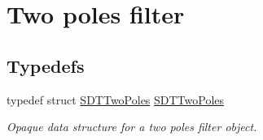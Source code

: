 \hypertarget{group__twopoles}{}\section{Two poles filter}
\label{group__twopoles}
\subsection*{Typedefs}
\begin{DoxyCompactItemize}
\item 
\hypertarget{group__twopoles_gab843f82d5b6d8ab18ebdf6f43bf0ad6d}{}typedef struct \hyperlink{group__twopoles_gab843f82d5b6d8ab18ebdf6f43bf0ad6d}{S\+D\+T\+Two\+Poles} \hyperlink{group__twopoles_gab843f82d5b6d8ab18ebdf6f43bf0ad6d}{S\+D\+T\+Two\+Poles}\label{group__twopoles_gab843f82d5b6d8ab18ebdf6f43bf0ad6d}

\begin{DoxyCompactList}\small\item\em Opaque data structure for a two poles filter object. \end{DoxyCompactList}\end{DoxyCompactItemize}
